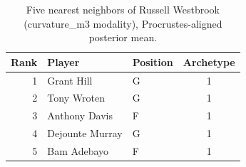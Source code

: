 \begin{table}[htbp]
  \centering\small
  \begin{tabular}{rllc}
    \toprule
    Rank & Player & Position & Archetype \\
    \midrule
    1 & Grant Hill & G & 1 \\
    2 & Tony Wroten & G & 1 \\
    3 & Anthony Davis & F & 1 \\
    4 & Dejounte Murray & G & 1 \\
    5 & Bam Adebayo & F & 1 \\
    \bottomrule
  \end{tabular}
  \caption{Five nearest neighbors of Russell Westbrook (curvature_m3 modality), Procrustes-aligned posterior mean.}
  \label{tab:Russell_Westbrook_neighbors_curvature_m3}
\end{table}

